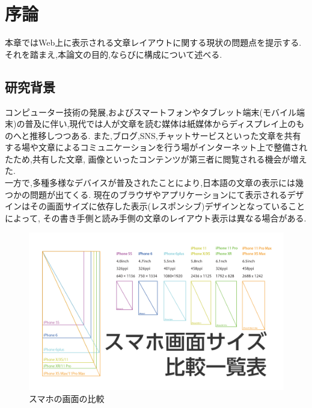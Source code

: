 
\chapter{序論}
\label{chap:introduction}

本章ではWeb上に表示される文章レイアウトに関する現状の問題点を提示する.
それを踏まえ,本論⽂の目的,ならびに構成について述べる.

\newpage




\section{研究背景}

コンピューター技術の発展,およびスマートフォンやタブレット端末(モバイル端末)の普及に伴い,現代では人が文章を読む媒体は紙媒体からディスプレイ上のものへと推移しつつある.
また,ブログ,SNS,チャットサービスといった文章を共有する場や文章によるコミュニケーションを行う場がインターネット上で整備されたため,共有した文章, 画像といったコンテンツが第三者に閲覧される機会が増えた.
\\一方で,多種多様なデバイスが普及されたことにより,日本語の文章の表示には幾つかの問題が出てくる.
現在のブラウザやアプリケーションにて表示されるデザインはその画面サイズに依存した表示(レスポンシブ)デザインとなっていることによって,
その書き手側と読み手側の文章のレイアウト表示は異なる場合がある.

\begin{figure}[H]
    \centering
    \label{fig:image1}
    \includegraphics[width=0.7\columnwidth]{image/01/img1.png}
    \caption[スマホの画面の比較] {スマホの画面の比較\footnotemark[1]}
\end{figure}


